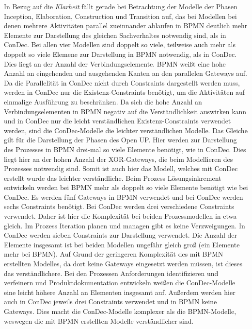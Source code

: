 In Bezug auf die \textit{Klarheit} fällt gerade bei Betrachtung der Modelle der Phasen Inception, Elaboration, Construction und Transition auf, das bei Modellen bei denen mehrere Aktivitäten parallel zueinnander ablaufen in BPMN deutlich mehr Elemente zur Darstellung des gleichen Sachverhaltes notwendig sind, als in ConDec. Bei allen vier Modellen sind doppelt so viele, teilweise auch mehr als doppelt so viele Elemene zur Darstellung in BPMN notwendig, als in ConDec. Dies liegt an der Anzahl der Verbindungselemente. BPMN weißt eine hohe Anzahl an eingehenden und ausgehenden Kanten an den parallelen Gateways auf. Da die Parallelität in ConDec nicht durch Constraints dargestellt werden muss, werden in ConDec nur die Existenz-Constraints benötigt, um die Aktivitäten auf einmalige Ausführung zu beschränken. Da sich die hohe Anzahl an Verbindungselementen in BPMN negativ auf die Verständlichkeit auswirken kann und in ConDec nur die leicht verständlichen Existenz-Constraints verwendet werden, sind die ConDec-Modelle die leichter verständlichen Modelle. \newline
Das Gleiche gilt für die Darstellung der Phasen des Open UP. Hier werden zur Darstellung des Prozesses in BPMN drei-mal so viele Elemente benötigt, wie in ConDec. Dies liegt hier an der hohen Anzahl der XOR-Gateways, die beim Modellieren des Prozesses notwendig sind. Somit ist auch hier das Modell, welches mit ConDec erstellt wurde das leichter verständliche. \newline
Beim Prozess Lösungsinkrement entwickeln werden bei BPMN mehr als doppelt so viele Elemente benötigt wie bei ConDec. Es werden fünf Gateways in BPMN verwendet und bei ConDec werden sechs Constraints benötigt. Bei ConDec werden drei verschiedene Constraints verwendet. Daher ist hier die Komplexität bei beiden Prozessmodellen in etwa gleich.\newline
Im Prozess Iteration planen und managen gibt es keine Verzweigungen. In ConDec werden sieben Constraints zur Darstellung verwendet. Die Anzahl der Elemente insgesamt ist bei beiden Modellen ungefähr gleich groß (ein Elemente mehr bei BPMN). Auf Grund der geringeren Komplexität des mit BPMN erstellten Modelles, da dort keine Gateways eingesetzt werden müssen, ist dieses das verständlichere.\newline
Bei den Prozessen Anforderungen identifizieren und verfeinern und Produktdokumentation entwickeln weißen die ConDec-Modelle eine leicht höhere Anzahl an Elementen insgesamt auf. Außerdem werden hier auch in ConDec jeweils drei Constraints verwendet und in BPMN keine Gateways. Dies macht die ConDec-Modelle komplexer als die BPMN-Modelle, weswegen die mit BPMN erstellten Modelle verständlicher sind.\newline
